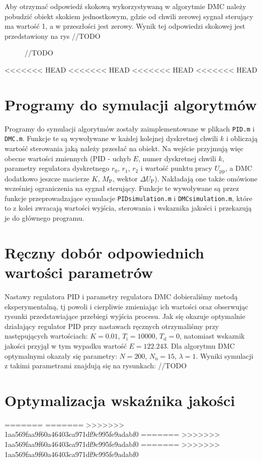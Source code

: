 Aby otrzymać odpowiedź skokową wykorzystywaną w algorytmie DMC należy pobudzić obiekt skokiem jednostkowym, gdzie od chwili zerowej sygnał sterujący ma wartość 1, a w przeszłości jest zerowy. Wynik tej odpowiedzi skokowej jest przedstawiony na rys //TODO
\begin{figure}
	//TODO
\end{figure}
<<<<<<< HEAD
<<<<<<< HEAD
<<<<<<< HEAD
<<<<<<< HEAD

\section{Programy do symulacji algorytmów}
Programy do symulacji algorytmów zostały zaimplementowane w plikach \texttt{PID.m} i \texttt{DMC.m}. Funkcje te są wywoływane w każdej kolejnej dyskretnej chwili $k$ i obliczają wartość sterowania jaką należy przesłać na obiekt. Na wejście przyjmują więc obecne wartości zmiennych (PID - uchyb $E$, numer dyskretnej chwili $k$, parametry regulatora dyskretnego $r_{\mathrm{0}}$, $r_{\mathrm{1}}$, $r_{\mathrm{2}}$ i wartość punktu pracy $U_{\mathrm{pp}}$, a DMC dodatkowo jeszcze macierze $K$, $M_{\mathrm{P}}$, wektor $\Delta U_{\mathrm{P}}$). Nakładają one także omówione wcześniej ograniczenia na sygnał sterujący. Funkcje te wywoływane są przez funkcje przeprowadzające symulacje \texttt{PIDsimulation.m} i \texttt{DMCsimulation.m}, które to z kolei zwracają wartości wyjścia, sterowania i wskaznika jakości i przekazują je do głównego programu.

\section{Ręczny dobór odpowiednich wartości parametrów}
Nastawy regulatora PID i parametry regulatora DMC dobieraliśmy metodą eksperymentalną, tj powoli i cierpliwie zmieniając ich wartości oraz obserwując rysunki przedstawiające przebiegi wyjścia procesu. Jak się okazuje optymalnie działający regulator PID przy nastawach ręcznych otrzymaliśmy przy następujących wartościach: $K=\num{0.01}$, $T_\mathrm{i}=10000$, $T_\mathrm{d}=0$, natomiast wskaznik jakości przyjął w tym wypadku wartość $E=\num{122.243}$. Dla algorytmu DMC optymalnymi okazały się parametry: $N=200$, $N_\mathrm{u}=15$, $\lambda=1$. Wyniki symulacji z takimi parametrami znajdują się na rysunkach: //TODO
\section{Optymalizacja wskaźnika jakości}
=======
=======
>>>>>>> 1aa569faa9f60a46403ca971df9c995fe9adabf0
=======
>>>>>>> 1aa569faa9f60a46403ca971df9c995fe9adabf0
=======
>>>>>>> 1aa569faa9f60a46403ca971df9c995fe9adabf0

